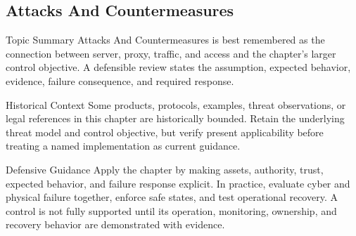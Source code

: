 \documentclass[11pt,letterpaper]{article}
\begin{document}
\subsection*{Attacks And Countermeasures}
\begin{CornellNotesTable}
\end{CornellNotesTable}
\begin{CornellSummaryBox}{Topic Summary}
Attacks And Countermeasures is best remembered as the connection between server, proxy, traffic, and access and the chapter's larger control objective. A defensible review states the assumption, expected behavior, evidence, failure consequence, and required response.
\end{CornellSummaryBox}
\begin{CornellWarningBox}{Historical Context}
Some products, protocols, examples, threat observations, or legal references in this chapter are historically bounded. Retain the underlying threat model and control objective, but verify present applicability before treating a named implementation as current guidance.
\end{CornellWarningBox}
\begin{CornellOverviewBox}{Defensive Guidance}
Apply the chapter by making assets, authority, trust, expected behavior, and failure response explicit. In practice, evaluate cyber and physical failure together, enforce safe states, and test operational recovery. A control is not fully supported until its operation, monitoring, ownership, and recovery behavior are demonstrated with evidence.
\end{CornellOverviewBox}
\end{document}
